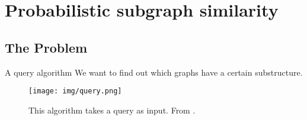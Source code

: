 \documentclass[10pt, aspectratio=149]{beamer}
\begin{document}
\section[Subgraph Similarity Search on Probabilistic Graphs]
{Probabilistic subgraph similarity}

\subsection{The Problem}

\begin{frame}{A query algorithm}
We want to find out which graphs have a certain substructure.

\begin{figure}
    \centering
    \texttt{[image: img/query.png]}
    \caption{This algorithm takes a query as input. From \cite{structural}.}
\end{figure}
    
\end{frame}
\end{document}
